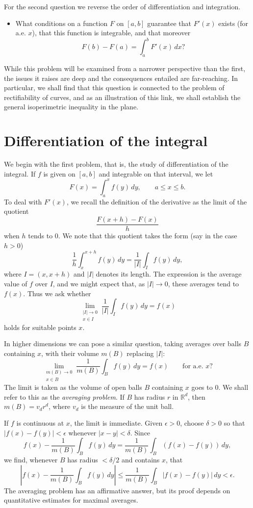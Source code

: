 \documentclass[11pt,openany]{book}
\begin{document}
For the second question we reverse the order of differentiation and integration.
\begin{itemize}
\item What conditions on a function $F$ on $[a,b]$ guarantee that $F'(x)$ exists (for a.e. $x$), that this function is integrable, and that moreover
\[
F(b)-F(a)=\int_a^b F'(x)\,dx?
\]
\end{itemize}
While this problem will be examined from a narrower perspective than the first, the issues it raises are deep and the consequences entailed are far-reaching. In particular, we shall find that this question is connected to the problem of rectifiability of curves, and as an illustration of this link, we shall establish the general isoperimetric inequality in the plane.

\section{Differentiation of the integral}

We begin with the first problem, that is, the study of differentiation of the integral. If $f$ is given on $[a,b]$ and integrable on that interval, we let
\[
F(x)=\int_a^x f(y)\,dy,\qquad a\le x\le b.
\]
To deal with $F'(x)$, we recall the definition of the derivative as the limit of the quotient
\[
\frac{F(x+h)-F(x)}{h}
\]
when $h$ tends to $0$. We note that this quotient takes the form (say in the case $h>0$)
\[
\frac1h\int_x^{x+h}f(y)\,dy=\frac1{|I|}\int_I f(y)\,dy,
\]
where $I=(x,x+h)$ and $|I|$ denotes its length. The expression is the average value of $f$ over $I$, and we might expect that, as $|I|\to0$, these averages tend to $f(x)$. Thus we ask whether
\[
\lim_{\substack{|I|\to0\\x\in I}}\frac1{|I|}\int_I f(y)\,dy=f(x)
\]
holds for suitable points $x$.

In higher dimensions we can pose a similar question, taking averages over balls $B$ containing $x$, with their volume $m(B)$ replacing $|I|$:
\[
\lim_{\substack{m(B)\to0\\x\in B}}\frac1{m(B)}\int_B f(y)\,dy=f(x)\qquad\text{for a.e. }x?
\]
The limit is taken as the volume of open balls $B$ containing $x$ goes to $0$. We shall refer to this as the \emph{averaging problem}. If $B$ has radius $r$ in $\mathbb R^d$, then $m(B)=v_dr^d$, where $v_d$ is the measure of the unit ball.

If $f$ is continuous at $x$, the limit is immediate. Given $\epsilon>0$, choose $\delta>0$ so that $|f(x)-f(y)|<\epsilon$ whenever $|x-y|<\delta$. Since
\[
f(x)-\frac1{m(B)}\int_B f(y)\,dy
=\frac1{m(B)}\int_B(f(x)-f(y))\,dy,
\]
we find, whenever $B$ has radius $<\delta/2$ and contains $x$, that
\[
\left|f(x)-\frac1{m(B)}\int_B f(y)\,dy\right|
\le \frac1{m(B)}\int_B|f(x)-f(y)|\,dy<\epsilon.
\]
The averaging problem has an affirmative answer, but its proof depends on quantitative estimates for maximal averages.
\end{document}

